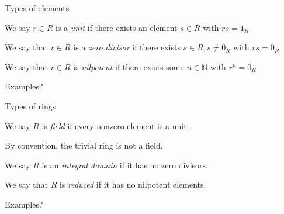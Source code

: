\documentclass{beamer}
\begin{document}
\begin{frame}{Types of elements}


\begin{definition}
We say $r\in R$ is a \emph{unit} if there exists an element $s\in R$ with $rs=1_R$
\end{definition}

\begin{definition}
We say that $r\in R$ is a \emph{zero divisor} if there exists $s\in R, s\neq 0_R$ with $rs=0_R$
\end{definition}

\begin{definition}
We say that $r\in R$ is \emph{nilpotent} if there exists some $n\in\mathbb{N}$ with $r^n=0_R$
\end{definition}

\begin{block}{Examples?}
 \end{block}

\end{frame}


\begin{frame}{Types of rings}

\begin{definition}
We say $R$ is \emph{field} if every nonzero element is a unit.
\end{definition}
By convention, the trivial ring is not a field.
\begin{definition}
We say $R$ is an \emph{integral domain} if it has no zero divisors.
\end{definition}

\begin{definition}
We say that $R$ is \emph{reduced} if it has no nilpotent elements.
\end{definition}

\begin{block}{Examples?}
\end{block}

\end{frame}
\end{document}
